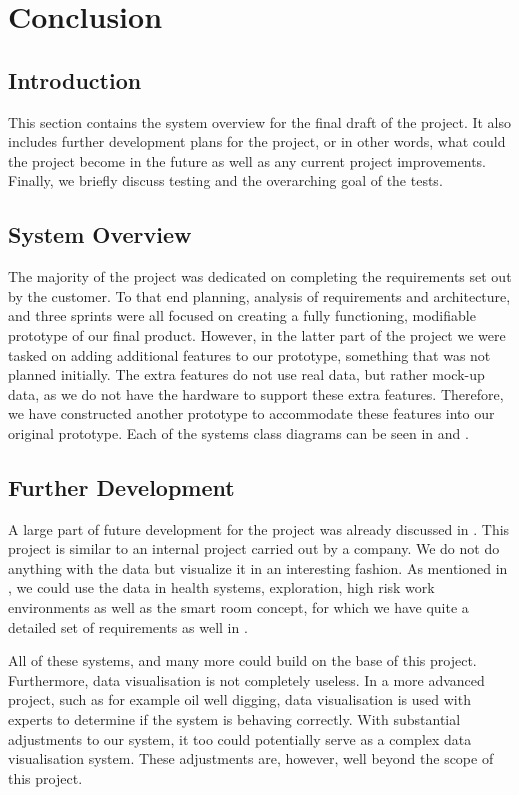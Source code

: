 \documentclass[../document]{subfiles}
\begin{document}
\section{Conclusion}

\subsection{Introduction}
This section contains the system overview for the final draft of the project. It also includes further development plans for the project, or in other words, what could the project become in the future as well as any current project improvements. Finally, we briefly discuss testing and the overarching goal of the tests.

\subsection{System Overview}
The majority of the project was dedicated on completing the requirements set out by the customer. To that end planning, analysis of requirements and architecture, and three sprints were all focused on creating a fully functioning, modifiable prototype of our final product. However, in the latter part of the project we were tasked on adding additional features to our prototype, something that was not planned initially. The extra features do not use real data, but rather mock-up data, as we do not have the hardware to support these extra features. Therefore, we have constructed another prototype to accommodate these features into our original prototype. Each of the systems class diagrams can be seen in  and .

\subsection{Further Development}
A large part of future development for the project was already discussed in . This project is similar to an internal project carried out by a company. We do not do anything with the data but visualize it in an interesting fashion. As mentioned in , we could use the data in health systems, exploration, high risk work environments as well as the smart room concept, for which we have quite a detailed set of requirements as well in . 

All of these systems, and many more could build on the base of this project. Furthermore, data visualisation is not completely useless. In a more advanced project, such as for example oil well digging, data visualisation is used with experts to determine if the system is behaving correctly. With substantial adjustments to our system, it too could potentially serve as a complex data visualisation system. These adjustments are, however, well beyond the scope of this project.
\end{document}
